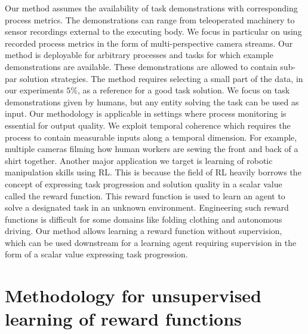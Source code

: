 \documentclass[\home/main.tex]{subfiles}
\begin{document}
Our method assumes the availability of task demonstrations with corresponding process metrics. The demonstrations can range from teleoperated machinery to sensor recordings external to the executing body. We focus in particular on using recorded process metrics in the form of multi-perspective camera streams. Our method is deployable for arbitrary processes and tasks for which example demonstrations are available. These demonstrations are allowed to contain sub-par solution strategies. The method requires selecting a small part of the data, in our experiments $5\%$, as a reference for a good task solution. We focus on task demonstrations given by humans, but any entity solving the task can be used as input. Our methodology is applicable in settings where process monitoring is essential for output quality. We exploit temporal coherence which requires the process to contain measurable inputs along a temporal dimension.
For example, multiple cameras filming how human workers are sewing the front and back of a shirt together.
Another major application we target is learning of robotic manipulation skills using RL. This is because the field of RL heavily borrows the concept of expressing task progression and solution quality in a scalar value called the reward function. This reward function is used to learn an agent to solve a designated task in an unknown environment. Engineering such reward functions is difficult for some domains like folding clothing and autonomous driving. Our method allows learning a reward function without supervision, which can be used downstream for a learning agent requiring supervision in the form of a scalar value expressing task progression.

\section{Methodology for unsupervised learning of reward functions}\label{sec:methodology}
\end{document}
